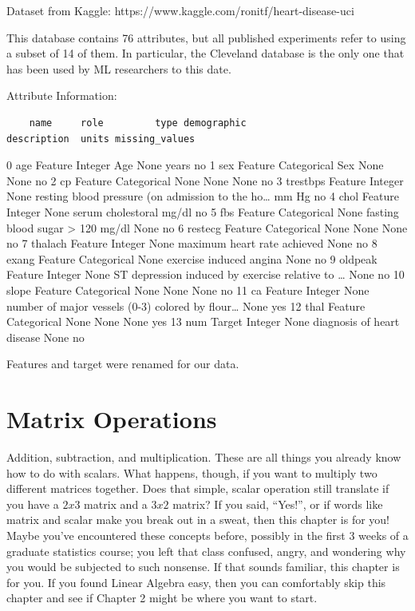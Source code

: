 \documentclass[
  letterpaper,
]{krantz}
\begin{document}
Dataset from Kaggle: https://www.kaggle.com/ronitf/heart-disease-uci

This database contains 76 attributes, but all published experiments
refer to using a subset of 14 of them. In particular, the Cleveland
database is the only one that has been used by ML researchers to this
date.

Attribute Information:

\begin{verbatim}
    name     role         type demographic                                        description  units missing_values
\end{verbatim}

0 age Feature Integer Age None years no 1 sex Feature Categorical Sex
None None no 2 cp Feature Categorical None None None no 3 trestbps
Feature Integer None resting blood pressure (on admission to the
ho\ldots{} mm Hg no 4 chol Feature Integer None serum cholestoral mg/dl
no 5 fbs Feature Categorical None fasting blood sugar \textgreater{} 120
mg/dl None no 6 restecg Feature Categorical None None None no 7 thalach
Feature Integer None maximum heart rate achieved None no 8 exang Feature
Categorical None exercise induced angina None no 9 oldpeak Feature
Integer None ST depression induced by exercise relative to \ldots{} None
no 10 slope Feature Categorical None None None no 11 ca Feature Integer
None number of major vessels (0-3) colored by flour\ldots{} None yes 12
thal Feature Categorical None None None yes 13 num Target Integer None
diagnosis of heart disease None no

Features and target were renamed for our data.

\chapter{Matrix Operations}\label{sec-matrix-operations}

Addition, subtraction, and multiplication. These are all things you
already know how to do with scalars. What happens, though, if you want
to multiply two different matrices together. Does that simple, scalar
operation still translate if you have a \(2x3\) matrix and a \(3x2\)
matrix? If you said, ``Yes!'', or if words like matrix and scalar make
you break out in a sweat, then this chapter is for you! Maybe you've
encountered these concepts before, possibly in the first 3 weeks of a
graduate statistics course; you left that class confused, angry, and
wondering why you would be subjected to such nonsense. If that sounds
familiar, this chapter is for you. If you found Linear Algebra easy,
then you can comfortably skip this chapter and see if Chapter 2 might be
where you want to start.
\end{document}
